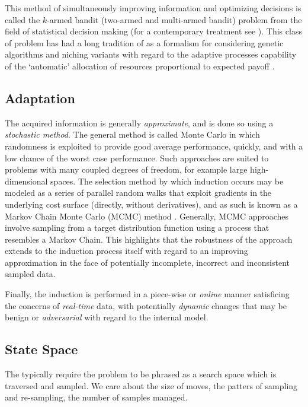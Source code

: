 \documentclass[a4paper, 11pt]{article}
\begin{document}
This method of simultaneously improving information and optimizing decisions is called the $k$-armed bandit (two-armed and multi-armed bandit) problem from the field of statistical decision making \cite{Robbins1952} (for a contemporary treatment see \cite{Bergemann2006}). This class of problem has had a long tradition of as a formalism for considering genetic algorithms and niching variants with regard to the adaptive processes capability of the `automatic' allocation of resources proportional to expected payoff \cite{Goldberg1989}.

% 
% 
\subsection{Adaptation}

The acquired information is generally \emph{approximate}, and is done so using a \emph{stochastic method}. The general method is called Monte Carlo in which randomness is exploited to provide good average performance, quickly, and with a low chance of the worst case performance. Such approaches are suited to problems with many coupled degrees of freedom, for example large high-dimensional spaces. The selection method by which induction occurs may be modeled as a series of parallel random walks that exploit gradients in the underlying cost surface (directly, without derivatives), and as such is known as a Markov Chain Monte Carlo (MCMC) method \cite{Andrieu2003, Clark2005}. Generally, MCMC approaches involve sampling from a target distribution function using a process that resembles a Markov Chain. This highlights that the robustness of the approach extends to the induction process itself with regard to an improving approximation in the face of potentially incomplete, incorrect and inconsistent sampled data. 




Finally, the induction is performed in a piece-wise or \emph{online} manner satisficing the concerns of \emph{real-time} data, with potentially \emph{dynamic} changes that may be benign or \emph{adversarial} with regard to the internal model.


% 
% 
\subsection{State Space}
The typically require the problem to be phrased as a search space which is traversed and sampled.
We care about the size of moves, the patters of sampling and re-sampling, the number of samples managed.
\end{document}
